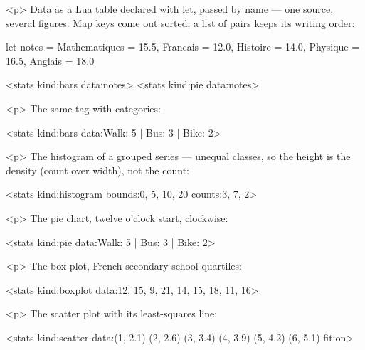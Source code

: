 \documentclass[
  margins=24,
  font=Latin Modern Roman,
  size=12,
  linespread=1.4,
  lang=en
]{scholatex}
\begin{document}
<p>{ Data as a Lua table declared with let, passed by name --- one source,
several figures. Map keys come out sorted; a list of pairs keeps its
writing order: }

let notes = {
	Mathematiques = 15.5,
	Francais = 12.0,
	Histoire = 14.0,
	Physique = 16.5,
	Anglais = 18.0
}

<stats kind:bars data:notes>
<stats kind:pie data:notes>

<p>{ The same tag with categories: }

<stats kind:bars data:{Walk: 5 | Bus: 3 | Bike: 2}>

<p>{ The histogram of a grouped series --- unequal classes, so the height
is the density (count over width), not the count: }

<stats kind:histogram bounds:{0, 5, 10, 20} counts:{3, 7, 2}>

<p>{ The pie chart, twelve o'clock start, clockwise: }

<stats kind:pie data:{Walk: 5 | Bus: 3 | Bike: 2}>

<p>{ The box plot, French secondary-school quartiles: }

<stats kind:boxplot data:{12, 15, 9, 21, 14, 15, 18, 11, 16}>

<p>{ The scatter plot with its least-squares line: }

<stats kind:scatter data:{(1, 2.1) (2, 2.6) (3, 3.4) (4, 3.9) (5, 4.2) (6, 5.1)} fit:on>
\end{document}
